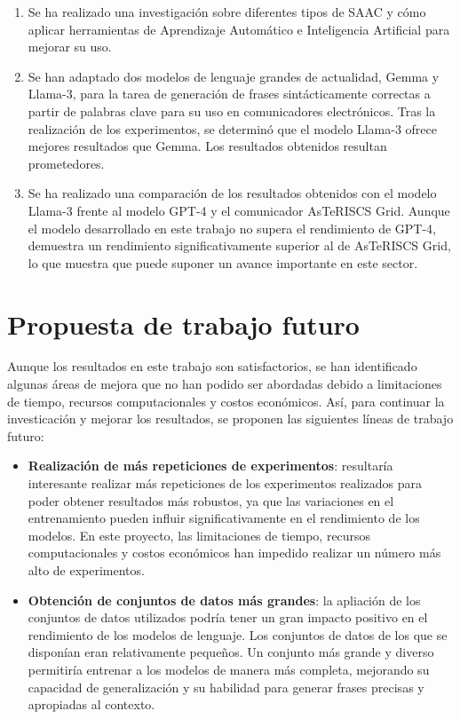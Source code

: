 \documentclass[11pt,spanish,listoffigures,listoftables]{tfgetsinf}
\begin{document}
\begin{enumerate}
	\item Se ha realizado una investigación sobre diferentes tipos de SAAC y cómo aplicar herramientas de Aprendizaje Automático e Inteligencia Artificial para mejorar su uso.
	\item Se han adaptado dos modelos de lenguaje grandes de actualidad, Gemma y Llama-3, para la tarea de generación de frases sintácticamente correctas a partir de palabras clave para su uso en comunicadores electrónicos. Tras la realización de los experimentos, se determinó que el modelo Llama-3 ofrece mejores resultados que Gemma. Los resultados obtenidos resultan prometedores.
	\item Se ha realizado una comparación de los resultados obtenidos con el modelo Llama-3 frente al modelo GPT-4 y el comunicador AsTeRISCS Grid. Aunque el modelo desarrollado en este trabajo no supera el rendimiento de GPT-4, demuestra un rendimiento significativamente superior al de AsTeRISCS Grid, lo que muestra que puede suponer un avance importante en este sector.
\end{enumerate}

\section{Propuesta de trabajo futuro}

Aunque los resultados en este trabajo son satisfactorios, se han identificado algunas áreas de mejora que no han podido ser abordadas debido a limitaciones de tiempo, recursos computacionales y costos económicos. Así, para continuar la investicación y mejorar los resultados, se proponen las siguientes líneas de trabajo futuro:

\begin{itemize}
	\item \textbf{Realización de más repeticiones de experimentos}: resultaría interesante realizar más repeticiones de los experimentos realizados para poder obtener resultados más robustos, ya que las variaciones en el entrenamiento pueden influir significativamente en el rendimiento de los modelos. En este proyecto, las limitaciones de tiempo, recursos computacionales y costos económicos han impedido realizar un número más alto de experimentos.
	\item \textbf{Obtención de conjuntos de datos más grandes}: la apliación de los conjuntos de datos utilizados podría tener un gran impacto positivo en el rendimiento de los modelos de lenguaje. Los conjuntos de datos de los que se disponían eran relativamente pequeños. Un conjunto más grande y diverso permitiría entrenar a los modelos de manera más completa, mejorando su capacidad de generalización y su habilidad para generar frases precisas y apropiadas al contexto.
\end{itemize}
\end{document}
